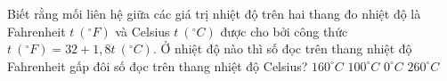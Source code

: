 


\begin{vidu}
	Biết rằng mối liên hệ giữa các giá trị nhiệt độ trên hai thang đo nhiệt độ là Fahrenheit $t\ (^\circ F)$ và Celsius $t\ (^\circ C)$ được cho bởi công thức $t\ (^\circ F)=32+1,8t\ (^\circ C)$. Ở nhiệt độ nào thì số đọc trên thang nhiệt độ Fahrenheit gấp đôi số đọc trên thang nhiệt độ Celsius?
	\choice
	{\True $160^\circ C$}
	{$100^\circ C$}
	{$0^\circ C$}
	{$260^\circ C$}
	\end{vidu}
	 

